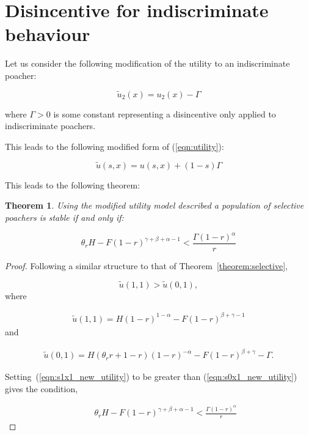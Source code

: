 \documentclass[10pt]{article}
\newtheorem{theorem}{Theorem}
\begin{document}
\section{Disincentive for indiscriminate behaviour}

Let us consider the following modification of the utility to an indiscriminate
poacher:

\begin{equation}
    \label{eqn:modified_utility_for_ind}
    \tilde u_2(x) = u_2(x) - \Gamma
\end{equation}

where \(\Gamma>0\) is some constant representing a disincentive only applied to
indiscriminate poachers.

This leads to the following modified form of (\ref{eqn:utility}):

\begin{equation}
    \label{eqn:modified_utility}
    \tilde u(s, x) = u(s, x) + (1 - s) \Gamma
\end{equation}

This leads to the following theorem:

\begin{theorem}\label{theorem:selective_new_utility}
Using the modified utility model described
a population of selective poachers is stable if and only if:

\begin{equation}\label{eq:selective_condition_new_utility}
\theta_r H -  F(1 -r) ^{\gamma + \beta + \alpha -1} < \frac{\Gamma (1- r) ^ {\alpha}}{r}
\end{equation}

\end{theorem}

\begin{proof}
    Following a similar structure to that of Theorem~\ref{theorem:selective}, 

    \begin{equation}
    \tilde{u}(1,1) > \tilde{u}(0,1),
    \end{equation}    
    where
    
    \begin{eqnarray}
    \label{eqn:s1x1_new_utility}
    \tilde{u}(1,1) = H(1 - r)^{1 - \alpha} - F(1 - r)^{\beta + \gamma - 1}
    \end{eqnarray}    
    and 
    
    \begin{eqnarray}
    \label{eqn:s0x1_new_utility}
    \tilde{u}(0,1) = H(\theta_r r +1 - r)(1 - r)^{-\alpha} - F(1 - r)^{\beta + \gamma} - \Gamma.
    \end{eqnarray}

    Setting~(\ref{eqn:s1x1_new_utility}) to be greater than (\ref{eqn:s0x1_new_utility})
    gives the condition,

    \begin{eqnarray}
    \label{eqn:s1x1_s0x1_new_utility}
    &&\theta_r H -  F(1 -r) ^{\gamma + \beta + \alpha -1} < \frac{\Gamma (1- r) ^ {\alpha}}{r}
    \end{eqnarray} 
\end{proof}
\end{document}
